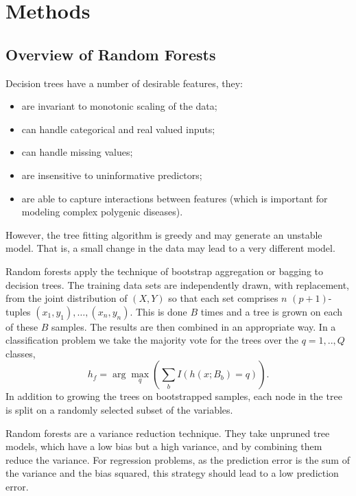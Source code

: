 \documentclass[10pt,letterpaper]{article}
\begin{document}
\section{Methods}
\label{section:methods}

\subsection{Overview of Random Forests}

Decision trees have a number of desirable features, they:
\begin{itemize}
  \item are invariant to monotonic scaling of the data;
  \item can handle categorical and real valued inputs;
  \item can handle missing values;
  \item are insensitive to uninformative predictors;
  \item are able to capture interactions between features (which is important for modeling complex polygenic diseases).
  \end{itemize}
However, the tree fitting algorithm is greedy and may generate an unstable model. That is, a small change in the data may
lead to a very different model. 

Random forests apply the technique of bootstrap aggregation or bagging to decision trees.  The training data sets are
independently drawn, with replacement, from the joint distribution of $(X,Y)$ so that each set comprises $n$
$(p+1)$-tuples $(x_1,y_1),\ldots, (x_n,y_n)$. This is done $B$ times and a tree is grown on each of these $B$ samples.
The results are then combined in an appropriate way. In a classification problem we take the majority vote for the trees
over the $q=1,..,Q$ classes,
\begin{equation*}
{{h_f}}= \arg \max_q \left(\sum_b I(h(x;B_b)=q)\right).
\end{equation*}
In addition to growing the trees
on bootstrapped samples, each node in the tree is split on a randomly
selected subset of the variables.

Random forests are a variance reduction technique. They take unpruned tree models, which have a low bias but a high
variance, and by combining them reduce the variance.  For regression problems, as the prediction error is the sum of the
variance and the bias squared, this strategy should lead to a low prediction error.
\end{document}
